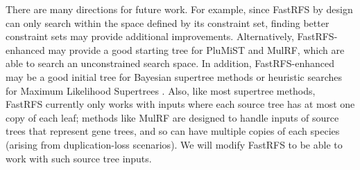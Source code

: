 There are many directions for future work.
For example, since FastRFS by design can only
search 
within the space defined by its constraint set,
finding better constraint sets may provide additional
improvements. Alternatively, FastRFS-enhanced
may provide a good starting tree
for PluMiST and MulRF, which are able to search
an unconstrained search space.
In addition, FastRFS-enhanced may be a good
initial tree for 
Bayesian supertree methods \cite{Akanni-HGT,Akanni-Bayesian} or 
heuristic searches for Maximum Likelihood Supertrees
 \cite{Akanni-MLsupertree}.
Also, like most
supertree methods, FastRFS currently only works with 
inputs where each source
tree has at most one copy of each leaf;
methods like MulRF are designed to handle inputs of  source trees
that represent gene trees, and so can
have multiple copies of each species (arising from duplication-loss
scenarios).
We will modify  FastRFS to be able to work with
such source tree inputs.

